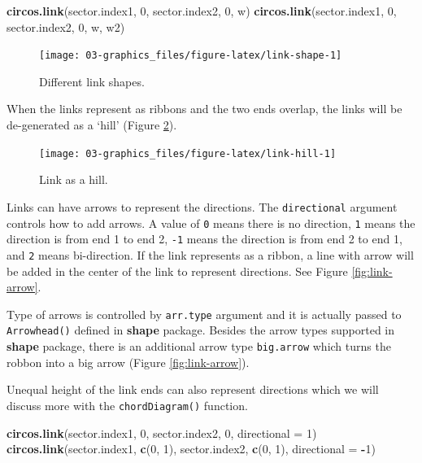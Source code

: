 \documentclass[]{book}
\newenvironment{Shaded}{\begin{snugshade}}{\end{snugshade}}
\newcommand{\KeywordTok}[1]{\textcolor[rgb]{0.13,0.29,0.53}{\textbf{#1}}}
\newcommand{\DataTypeTok}[1]{\textcolor[rgb]{0.13,0.29,0.53}{#1}}
\newcommand{\DecValTok}[1]{\textcolor[rgb]{0.00,0.00,0.81}{#1}}
\newcommand{\OperatorTok}[1]{\textcolor[rgb]{0.81,0.36,0.00}{\textbf{#1}}}
\newcommand{\NormalTok}[1]{#1}
\theoremstyle{definition}
\theoremstyle{definition}
\theoremstyle{remark}
\begin{document}
\begin{Shaded}
\begin{Highlighting}[]
\KeywordTok{circos.link}\NormalTok{(sector.index1, }\DecValTok{0}\NormalTok{, sector.index2, }\DecValTok{0}\NormalTok{, w)}
\KeywordTok{circos.link}\NormalTok{(sector.index1, }\DecValTok{0}\NormalTok{, sector.index2, }\DecValTok{0}\NormalTok{, w, w2)}
\end{Highlighting}
\end{Shaded}

\begin{figure}

{\centering \texttt{[image: 03-graphics\_files/figure-latex/link-shape-1]} 

}

\caption{Different link shapes.}\label{fig:link-shape}
\end{figure}

When the links represent as ribbons and the two ends overlap, the links
will be de-generated as a `hill' (Figure \ref{fig:link-hill}).

\begin{figure}

{\centering \texttt{[image: 03-graphics\_files/figure-latex/link-hill-1]} 

}

\caption{Link as a hill.}\label{fig:link-hill}
\end{figure}

Links can have arrows to represent the directions. The
\texttt{directional} argument controls how to add arrows. A value of
\texttt{0} means there is no direction, \texttt{1} means the direction
is from end 1 to end 2, \texttt{-1} means the direction is from end 2 to
end 1, and \texttt{2} means bi-direction. If the link represents as a
ribbon, a line with arrow will be added in the center of the link to
represent directions. See Figure \ref{fig:link-arrow}.

Type of arrows is controlled by \texttt{arr.type} argument and it is
actually passed to \texttt{Arrowhead()} defined in \textbf{shape}
package. Besides the arrow types supported in \textbf{shape} package,
there is an additional arrow type \texttt{big.arrow} which turns the
robbon into a big arrow (Figure \ref{fig:link-arrow}).

Unequal height of the link ends can also represent directions which we
will discuss more with the \texttt{chordDiagram()} function.

\begin{Shaded}
\begin{Highlighting}[]
\KeywordTok{circos.link}\NormalTok{(sector.index1, }\DecValTok{0}\NormalTok{, sector.index2, }\DecValTok{0}\NormalTok{, }\DataTypeTok{directional =} \DecValTok{1}\NormalTok{)}
\KeywordTok{circos.link}\NormalTok{(sector.index1, }\KeywordTok{c}\NormalTok{(}\DecValTok{0}\NormalTok{, }\DecValTok{1}\NormalTok{), sector.index2, }\KeywordTok{c}\NormalTok{(}\DecValTok{0}\NormalTok{, }\DecValTok{1}\NormalTok{), }\DataTypeTok{directional =} \OperatorTok{-}\DecValTok{1}\NormalTok{)}
\end{Highlighting}
\end{Shaded}
\end{document}
